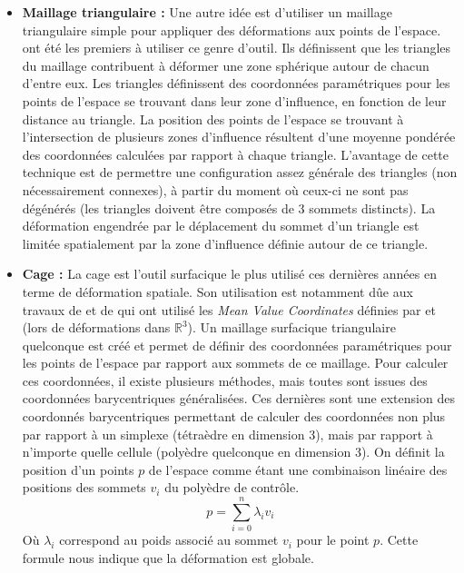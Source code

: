 \begin{itemize}
\item{\textbf{Maillage triangulaire :}} Une autre idée est d'utiliser
  un maillage triangulaire simple pour appliquer des déformations aux
  points de l'espace. \cite{KO03} ont été les premiers à utiliser ce
  genre d'outil. Ils définissent que les triangles du maillage
  contribuent à déformer une zone sphérique autour de chacun d'entre
  eux. Les triangles définissent des coordonnées paramétriques pour
  les points de l'espace se trouvant dans leur zone d'influence, en
  fonction de leur distance au triangle. La position des points de
  l'espace se trouvant à l'intersection de plusieurs zones d'influence
  résultent d'une moyenne pondérée des coordonnées calculées par
  rapport à chaque triangle. L'avantage de cette technique est de
  permettre une configuration assez générale des triangles (non
  nécessairement connexes), à partir du moment où ceux-ci ne sont pas
  dégénérés (les triangles doivent être composés de 3 sommets
  distincts). La déformation engendrée par le déplacement du sommet
  d'un triangle est limitée spatialement par la zone d'influence
  définie autour de ce triangle.
\item{\textbf{Cage :}} La cage est l'outil surfacique le plus utilisé
  ces dernières années en terme de déformation spatiale. Son
  utilisation est notamment dûe aux travaux de \cite{JSW05} et de
  \cite{HF06} qui ont utilisé les \textit{Mean Value Coordinates}
  définies par \cite{Flo03} et \cite{FKR05} (lors de déformations dans
  $\mathbb{R}^3$). Un maillage surfacique triangulaire quelconque est
  créé et permet de définir des coordonnées paramétriques pour les
  points de l'espace par rapport aux sommets de ce maillage. Pour
  calculer ces coordonnées, il existe plusieurs méthodes, mais toutes
  sont issues des coordonnées barycentriques généralisées. Ces
  dernières sont une extension des coordonnés barycentriques
  permettant de calculer des coordonnées non plus par rapport à un
  simplexe (tétraèdre en dimension 3), mais par rapport à n'importe
  quelle cellule (polyèdre quelconque en dimension 3). On définit la
  position d'un points $p$ de l'espace comme étant une combinaison
  linéaire des positions des sommets $v_i$ du polyèdre de contrôle.
  \begin{equation}
    p = \sum_{i=0}^n \lambda_iv_i
  \end{equation}
  Où $\lambda_i$ correspond au poids associé au sommet $v_i$ pour le
  point $p$. Cette formule nous indique que la déformation est
  globale.
\end{itemize}

